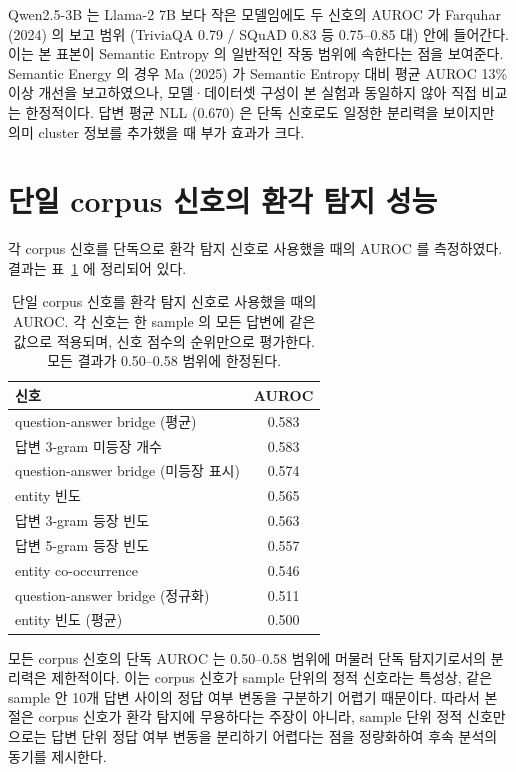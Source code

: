 \documentclass[oneside,ko,under]{snuthesis}
\begin{document}
Qwen2.5-3B 는 Llama-2 7B 보다 작은 모델임에도 두 신호의 AUROC 가 Farquhar (2024) 의 보고 범위 (TriviaQA 0.79 / SQuAD 0.83 등 0.75--0.85 대) 안에 들어간다. 이는 본 표본이 Semantic Entropy 의 일반적인 작동 범위에 속한다는 점을 보여준다. Semantic Energy 의 경우 Ma (2025) 가 Semantic Entropy 대비 평균 AUROC 13\% 이상 개선을 보고하였으나, 모델·데이터셋 구성이 본 실험과 동일하지 않아 직접 비교는 한정적이다. 답변 평균 NLL (0.670) 은 단독 신호로도 일정한 분리력을 보이지만 의미 cluster 정보를 추가했을 때 부가 효과가 크다.


\section{단일 corpus 신호의 환각 탐지 성능}\label{sec:negative}

각 corpus 신호를 단독으로 환각 탐지 신호로 사용했을 때의 AUROC 를 측정하였다. 결과는 표~\ref{tab:corpus_only} 에 정리되어 있다.

\begin{table}[htbp]
\centering
\small
\caption[단일 corpus 신호의 환각 탐지 성능]{단일 corpus 신호를 환각 탐지 신호로 사용했을 때의 AUROC. 각 신호는 한 sample 의 모든 답변에 같은 값으로 적용되며, 신호 점수의 순위만으로 평가한다. 모든 결과가 0.50--0.58 범위에 한정된다.}
\label{tab:corpus_only}
\begin{tabular}{@{}lc@{}}
\toprule
신호 & AUROC \\
\midrule
question-answer bridge (평균)          & 0.583 \\
답변 3-gram 미등장 개수                & 0.583 \\
question-answer bridge (미등장 표시)   & 0.574 \\
entity 빈도                            & 0.565 \\
답변 3-gram 등장 빈도                  & 0.563 \\
답변 5-gram 등장 빈도                  & 0.557 \\
entity co-occurrence                    & 0.546 \\
question-answer bridge (정규화)        & 0.511 \\
entity 빈도 (평균)                     & 0.500 \\
\bottomrule
\end{tabular}
\end{table}

모든 corpus 신호의 단독 AUROC 는 0.50--0.58 범위에 머물러 단독 탐지기로서의 분리력은 제한적이다. 이는 corpus 신호가 sample 단위의 정적 신호라는 특성상, 같은 sample 안 10개 답변 사이의 정답 여부 변동을 구분하기 어렵기 때문이다. 따라서 본 절은 corpus 신호가 환각 탐지에 무용하다는 주장이 아니라, sample 단위 정적 신호만으로는 답변 단위 정답 여부 변동을 분리하기 어렵다는 점을 정량화하여 후속 분석의 동기를 제시한다.
\end{document}
